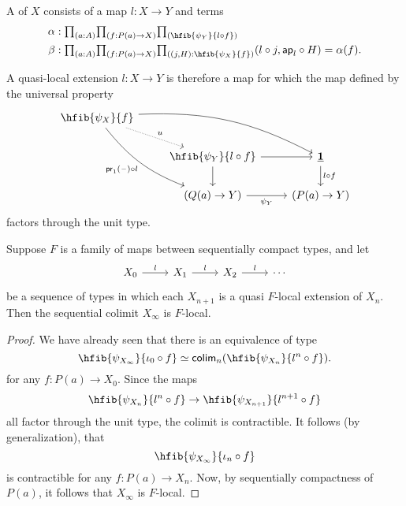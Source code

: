 \begin{defn}
A  of $X$ consists of a map $l:X\to Y$ and terms
\begin{align*}
\alpha & : \prd{a:A}{f:P(a)\to X}\hfib{\psi_Y}{l\circ f} \\
\beta & : \prd{a:A}{f:P(a)\to X}{(j,H):\hfib{\psi_X}{f}}\pairr{l\circ j,\apfunc{l}\circ H}=\alpha(f).
\end{align*}
\end{defn}

\begin{rmk}
A quasi-local extension $l:X\to Y$ is therefore a map for which the map defined by the universal property
\begin{equation*}
\begin{tikzcd}
\hfib{\psi_X}{f} \arrow[drr,bend left=15] \arrow[ddr, bend right=15,swap,"\proj1(\blank)\circ l"] \arrow[dr,densely dotted,"u"] \\
& \hfib{\psi_Y}{l\circ f} \arrow[r] \arrow[d] & \unit \arrow[d,"l\circ f"] \\
& (Q(a)\to Y) \arrow[r,swap,"\psi_Y"] & (P(a)\to Y)
\end{tikzcd}
\end{equation*}
factors through the unit type.
\end{rmk}

\begin{thm}
Suppose $F$ is a family of maps between sequentially compact types, and let
\begin{equation*}
\begin{tikzcd}
X_0 \arrow[r,"l"] & X_1 \arrow[r,"l"] & X_2 \arrow[r,"l"] & \cdots
\end{tikzcd}
\end{equation*}
be a sequence of types in which each $X_{n+1}$ is a quasi $F$-local extension of $X_n$. Then the sequential colimit $X_\infty$ is $F$-local.
\end{thm}

\begin{proof}
We have already seen that there is an equivalence of type
\begin{equation*}
\eqv{\hfib{\psi_{X_\infty}}{\iota_0\circ f}}{\tfcolim_n(\hfib{\psi_{X_n}}{l^n\circ f})}.
\end{equation*}
for any $f:P(a)\to X_0$. Since the maps
\begin{equation*}
\hfib{\psi_{X_n}}{l^n\circ f}\to \hfib{\psi_{X_{n+1}}}{l^{n+1}\circ f}
\end{equation*}
all factor through the unit type, the colimit is contractible. It follows (by generalization), that
\begin{equation*}
\hfib{\psi_{X_\infty}}{\iota_n\circ f}
\end{equation*}
is contractible for any $f:P(a)\to X_n$. Now, by sequentially compactness of $P(a)$, it follows that $X_\infty$ is $F$-local.
\end{proof}

